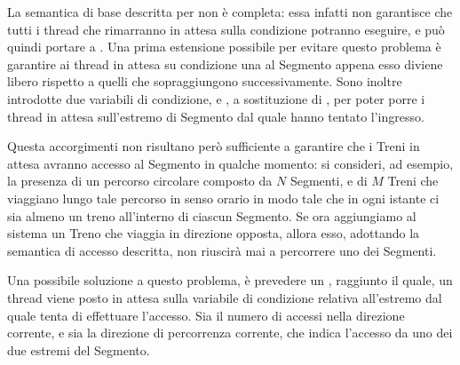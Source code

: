 \begin{description}
			La semantica di base descritta per  non è completa: essa infatti non garantisce che tutti i thread che rimarranno in attesa sulla condizione  potranno eseguire, e può quindi portare a . 			
			Una prima estensione possibile per evitare questo problema è garantire ai thread in attesa su condizione una  al Segmento appena esso diviene libero rispetto a quelli che sopraggiungono successivamente. Sono inoltre introdotte due variabili di condizione,  e , a sostituzione di , per poter porre i thread in attesa sull'estremo di Segmento dal quale hanno tentato l'ingresso.
			
			Questa accorgimenti non risultano però sufficiente a garantire che i Treni in attesa avranno accesso al Segmento in qualche momento: si consideri, ad esempio, la presenza di un percorso circolare composto da $N$ Segmenti, e di $M$ Treni che viaggiano lungo tale percorso in senso orario in modo tale che in ogni istante ci sia almeno un treno all'interno di ciascun Segmento. Se ora aggiungiamo al sistema un Treno che viaggia in direzione opposta, allora esso, adottando la semantica di accesso descritta, non riuscirà mai a percorrere uno dei Segmenti.			
			
			Una possibile soluzione a questo problema, è prevedere un , raggiunto il quale, un thread viene posto in attesa sulla variabile di condizione relativa all'estremo dal quale tenta di effettuare l'accesso. 
		Sia  il numero di accessi nella direzione corrente, e sia  la direzione di percorrenza corrente, che indica l'accesso da uno dei due estremi del Segmento.
		

\end{description}
